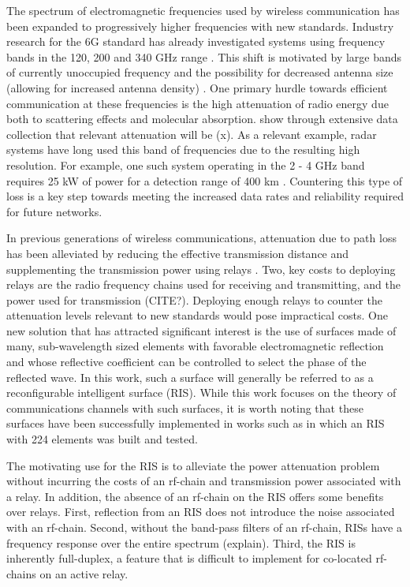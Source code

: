 The spectrum of electromagnetic frequencies used by wireless communication has been expanded to progressively higher frequencies with new standards. Industry research for the 6G standard has already investigated systems using frequency bands in the 120, 200 and 340 GHz range \cite{Koziol}. This shift is motivated by large bands of currently unoccupied frequency and the possibility for decreased antenna size (allowing for increased antenna density) \cite{akyildiz2018combating}. One primary hurdle towards efficient communication at these frequencies is the high attenuation of radio energy due both to scattering effects and molecular absorption. \cite{TODO} show through extensive data collection that relevant attenuation will be (x). 
As a relevant example, radar systems have long used this band of frequencies due to the resulting high resolution. For example, one such system operating in the 2 - 4 GHz band requires 25 kW of power for a detection range of 400 km \cite{TODO}. 
Countering this type of loss is a key step towards meeting the increased data rates and reliability required for future networks. 
\par
In previous generations of wireless communications, attenuation due to path loss has been alleviated by reducing the effective transmission distance 
and supplementing the transmission power using relays \cite{dahlman20134g}. Two, key costs to deploying relays are the radio frequency chains used for receiving and transmitting, and the power used for transmission (CITE?). Deploying enough relays to counter
the attenuation levels relevant to new standards would pose impractical costs. One new solution that has attracted significant interest is the use of surfaces made of many, sub-wavelength sized elements with favorable electromagnetic reflection and whose reflective coefficient can be controlled to select the phase of the reflected wave. In this work, such a surface will generally be referred to as a reconfigurable intelligent surface (RIS).
While this work focuses on the theory of communications channels with such surfaces, it is worth noting that these surfaces have been successfully implemented in works such as \cite{tan2018enabling} in which an RIS with 224 elements was built and tested. 
\par
The motivating use for the RIS is to alleviate the power attenuation problem without incurring the costs of an rf-chain and transmission power 
associated with a relay. In addition, the absence of an rf-chain on the RIS offers some benefits over relays. First, reflection from an RIS does not introduce the noise associated with an rf-chain. Second, without the band-pass filters of an rf-chain, RISs have a frequency response over the entire spectrum (explain). Third, the RIS is inherently full-duplex, a feature that is difficult to implement for co-located rf-chains on an active relay. 
